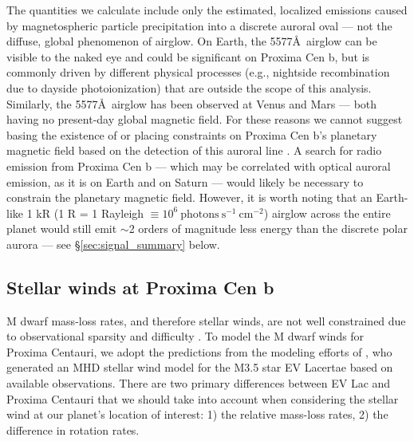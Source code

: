 \documentclass{emulateapj}
\newcommand{\XXX}[1]{#1}      %
\begin{document}
The quantities we calculate include only the estimated, localized emissions caused by magnetospheric particle precipitation into a discrete auroral oval --- not the diffuse, global phenomenon of airglow. On Earth, the 5577\AA\ airglow can be visible to the naked eye and could be significant on Proxima Cen b, but is commonly driven by different physical processes (e.g., nightside recombination due to dayside photoionization) that are outside the scope of this analysis. Similarly, the 5577\AA\ airglow has been observed at Venus \citep[e.g.][]{Slanger2001} and Mars \citep[e.g.][]{Seth2002} --- both having no present-day global magnetic field. For these reasons we cannot suggest basing the existence of or placing constraints on Proxima Cen b's planetary magnetic field based on the detection of this auroral line \XXX{\citep[see, for instance,][]{Griessmeier2015}. \XXX{A search for radio emission from Proxima Cen b --- which may be correlated with optical auroral emission, as it is on Earth and on Saturn \citep{Kurth2005} --- would likely be necessary to constrain the planetary magnetic field.} However, it is worth noting that an Earth-like 1 kR (1 R = 1 Rayleigh $\equiv 10^{6}\ \mathrm{photons\ s^{-1}\ cm^{-2}}$) airglow across the entire planet would still emit $\sim$2 orders of magnitude less energy than the discrete polar aurora --- see \S\ref{sec:signal_summary} below. }


\subsection{Stellar winds at Proxima Cen b}
\label{sec:stellar_winds}

M dwarf mass-loss rates, and therefore stellar winds, are not well constrained due to observational sparsity and difficulty \citep[e.g.][]{Wood2004}. To model the M dwarf winds for Proxima Centauri, we adopt the predictions from the modeling efforts of \citet{Cohen2014}, who generated an MHD stellar wind model for the M3.5 star EV Lacertae based on available observations. There are two primary differences between EV Lac and Proxima Centauri that we should take into account when considering the stellar wind at our planet's location of interest: 1) the relative mass-loss rates, 2) the difference in rotation rates. 
\end{document}
